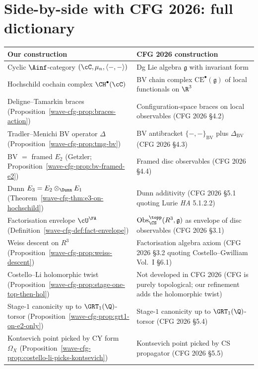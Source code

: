 \section*{Side-by-side with CFG 2026: full dictionary}

\begin{center}
\begin{tabular}{p{5.8cm}|p{9.2cm}}
\textbf{Our construction} &
\textbf{CFG 2026 construction} \\ \hline
Cyclic $\Ainf$-category $(\cC,\mu_n,\langle-,-\rangle)$ &
Dg Lie algebra $\mathfrak g$ with invariant form \\ \hline
Hochschild cochain complex $\CH^\bullet(\cC)$ &
BV chain complex $\mathrm{CE}^\bullet(\mathfrak g)$ of local
functionals on $\R^3$ \\ \hline
Deligne--Tamarkin braces
(Proposition~\ref{wave-cfg-prop:braces-action}) &
Configuration-space braces on local observables (CFG 2026 \S 4.2) \\ \hline
Tradler--Menichi BV operator $\Delta$
(Proposition~\ref{wave-cfg-prop:tmg-bv}) &
BV antibracket $\{-,-\}_{\mathrm{BV}}$ plus $\Delta_{\mathrm{BV}}$ (CFG 2026 \S 4.3) \\ \hline
BV $=$ framed $E_2$ (Getzler;
Proposition~\ref{wave-cfg-prop:bv-framed-e2}) &
Framed disc observables (CFG 2026 \S 4.4) \\ \hline
Dunn $E_3=E_2\otimes_\Dunn E_1$
(Theorem~\ref{wave-cfg-thm:e3-on-hochschild}) &
Dunn additivity (CFG 2026 \S 5.1 quoting Lurie \emph{HA} 5.1.2.2) \\ \hline
Factorisation envelope $\cU^\FA$
(Definition~\ref{wave-cfg-def:fact-envelope}) &
$\mathrm{Obs}^{\topp}_{\CS}(R^3,\mathfrak g)$ as envelope of disc observables (CFG 2026 \S 3.1) \\ \hline
Weiss descent on $R^3$
(Proposition~\ref{wave-cfg-prop:weiss-descent}) &
Factorisation algebra axiom (CFG 2026 \S 3.2 quoting Costello--Gwilliam Vol.~I \S 6.1) \\ \hline
Costello--Li holomorphic twist
(Proposition~\ref{wave-cfg-prop:stage-one-top-then-hol}) &
Not developed in CFG 2026 (CFG is purely topological; our refinement
adds the holomorphic twist) \\ \hline
Stage-$1$ canonicity up to $\GRT_1(\Q)$-torsor
(Proposition~\ref{wave-cfg-prop:grt1-on-e2-only}) &
Stage-$1$ canonicity up to $\GRT_1(\Q)$-torsor (CFG 2026 \S 5.4) \\ \hline
Kontsevich point picked by CY form $\Omega_X$
(Proposition~\ref{wave-cfg-prop:costello-li-picks-kontsevich}) &
Kontsevich point picked by CS propagator (CFG 2026 \S 5.5) \\ \hline
\end{tabular}
\end{center}

